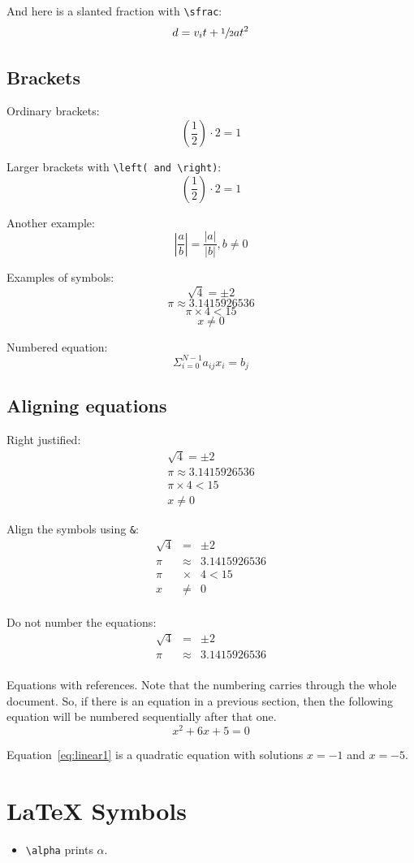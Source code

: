 \documentclass{article}
\begin{document}
And here is a slanted fraction with \texttt{\textbackslash sfrac}:
$$d = v_i t + \sfrac{1}{2} a t^2$$

\subsection{Brackets}
Ordinary brackets:
$$(\frac{1}{2}) \cdot 2 = 1$$

Larger brackets with \texttt{\textbackslash left( and \textbackslash right)}:
$$\left( \frac{1}{2} \right) \cdot 2 = 1$$

Another example:
$$\left| \frac{a}{b} \right| = \frac{|a|}{|b|}, b \neq 0$$

Examples of symbols:
$$\sqrt{4} = \pm 2$$
$$\pi \approx 3.1415926536$$
$$\pi \times 4 < 15$$
$$x \neq 0$$

Numbered equation:
\begin{equation}
\Sigma_{i=0}^{N - 1} a_{ij} x_i = b_j
\end{equation}

\subsection{Aligning equations}
Right justified:
\begin{eqnarray}
  \sqrt{4} = \pm 2 \\
  \pi \approx 3.1415926536 \\
  \pi \times 4 < 15 \\
  x \neq 0
\end{eqnarray}

Align the symbols using \texttt{\&}:
\begin{eqnarray}
  \sqrt{4} & = & \pm 2 \\
  \pi & \approx & 3.1415926536 \\
  \pi & \times & 4 < 15 \\
  x & \neq & 0 \\
\end{eqnarray}

Do not number the equations:
\begin{eqnarray*}
  \sqrt{4} & = & \pm 2 \\
  \pi & \approx & 3.1415926536 \\
\end{eqnarray*}

Equations with references.  Note that the numbering carries through the whole document.
So, if there is an equation in a previous section, then the following equation will
be numbered sequentially after that one.
\begin{equation}\label{eq:linear1}
x^2 + 6x + 5 = 0
\end{equation}

Equation~\ref{eq:linear1} is a quadratic equation with solutions $x=-1$ and $x=-5$.

\cleardoublepage

\section{LaTeX Symbols}
\begin{itemize}
    \item \texttt{\textbackslash alpha} prints $\alpha$.
\end{itemize}
\end{document}
